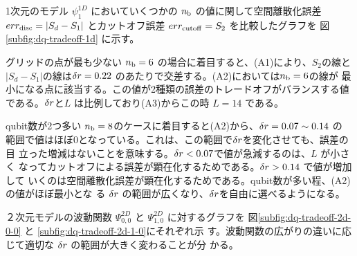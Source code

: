 \documentclass[fontsize=11pt]{jlreq}
\begin{document}
1次元のモデル $\psi_1^{1D}$ においていくつかの $n_{\mathrm{b}}$ の値に関して空間離散化誤差
$err_{\mathrm{disc}}=|S_d-S_1|$ とカットオフ誤差 $err_{\mathrm{cutoff}}=S_2$ を比較したグラフを
図 \ref{subfig:dq-tradeoff-1d} に示す。

グリッドの点が最も少ない $n_{\mathrm{b}}=6$ の場合に着目すると、(A1)により、$S_2$の線と
$|S_d-S_1|$の線は$\delta r=0.22$ のあたりで交差する。(A2)においては$n_{\mathrm{b}}=6$の線が
最小になる点に該当する。この値が2種類の誤差のトレードオフがバランスする値
である。$\delta r$と$L$ は比例しており(A3)からこの時 $L=14$ である。

qubit数が2つ多い $n_{\mathrm{b}}=8$のケースに着目すると(A2)から、$\delta r=0.07\sim0.14$ の
範囲で値はほぼ0となっている。これは、この範囲で$\delta r$を変化させても、誤差の目
立った増減はないことを意味する。$\delta r<0.07$で値が急減するのは、$L$ が小さく
なってカットオフによる誤差が顕在化するためである。$\delta r>0.14$ で値が増加して
いくのは空間離散化誤差が顕在化するためである。qubit数が多い程、(A2)の値がほぼ最小とな
る $\delta r$ の範囲が広くなり、$\delta r$を自由に選べるようになる。

２次元モデルの波動関数 $\Psi_{0,0}^{2D}$ と $\Psi_{1,0}^{2D}$ に対するグラフを
図\ref{subfig:dq-tradeoff-2d-0-0} と \ref{subfig:dq-tradeoff-2d-1-0}にそれぞれ示
す。波動関数の広がりの違いに応じて適切な $\delta r$ の範囲が大きく変わることが分
かる。
\end{document}
